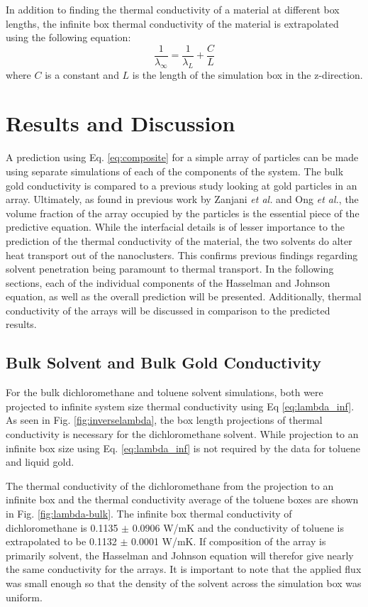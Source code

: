 In addition to finding the thermal conductivity of a material at different box lengths, the infinite box thermal conductivity of the material is extrapolated using the following equation:
\begin{equation}
    \frac{1}{\lambda_{\infty}}= \frac{1}{\lambda_L} +\frac{C}{L}
    \label{eq:lambda_inf}
\end{equation}
where $C$ is a constant and $L$ is the length of the simulation box in the z-direction.\cite{Hannah2015} 

\section{Results and Discussion}
A prediction using Eq. \ref{eq:composite} for a simple array of  particles can be made using separate simulations of each of the components of the system.
The bulk gold conductivity is compared to a previous study looking at gold particles in an array. 
Ultimately, as found in previous work by Zanjani \textit{et al.}\cite{Zanjani2014} and Ong \textit{et al.}\cite{Ong:2014yq}, the volume fraction of the array occupied by the particles is the essential piece of the predictive equation.
While the interfacial details is of lesser importance to the prediction of the thermal conductivity of the material, the two solvents do alter heat transport out of the nanoclusters.
This confirms previous findings regarding solvent penetration being paramount to thermal transport.
In the following sections, each of the individual components of the Hasselman and Johnson equation, as well as the overall prediction will be presented.
Additionally, thermal conductivity of the arrays will be discussed in comparison to the predicted results.

\subsection{Bulk Solvent and Bulk Gold Conductivity}
For the bulk dichloromethane and toluene solvent simulations, both were projected to infinite system size thermal conductivity using Eq \ref{eq:lambda_inf}. 
As seen in Fig. \ref{fig:inverselambda}, the box length projections of thermal conductivity is necessary for the dichloromethane solvent.
While projection to an infinite box size using Eq. \ref{eq:lambda_inf} is not required by the data for toluene and liquid gold.

The thermal conductivity of the dichloromethane from the projection to an infinite box and the thermal conductivity average of the toluene boxes are shown in Fig. \ref{fig:lambda-bulk}.
The infinite box thermal conductivity of dichloromethane is 0.1135 $\pm$ 0.0906 W/mK and the conductivity of toluene is extrapolated to be 0.1132 $\pm$ 0.0001 W/mK.
If composition of the array is primarily solvent, the Hasselman and Johnson equation will therefor give nearly the same conductivity for the arrays.
It is important to note that the applied flux was small enough so that the density of the solvent across the simulation box was uniform.

